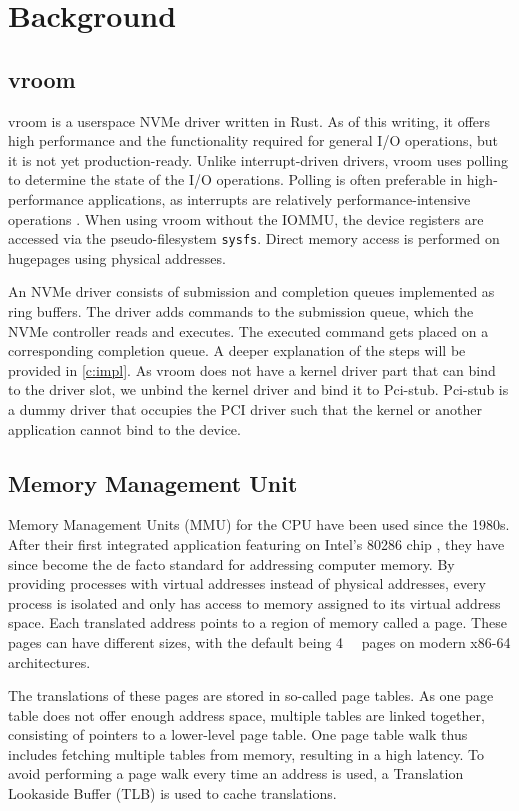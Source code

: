 \chapter{Background}

\section{vroom}
vroom is a userspace NVMe driver written in Rust. As of this writing, it offers high performance and the functionality required for general I/O operations, but it is not yet production-ready. Unlike interrupt-driven drivers, vroom uses polling to determine the state of the I/O operations. Polling is often preferable in high-performance applications, as interrupts are relatively performance-intensive operations \cite{spdksubmitting}.
When using vroom without the IOMMU, the device registers are accessed via the pseudo-filesystem \texttt{sysfs}. Direct memory access is performed on hugepages using physical addresses.

An NVMe driver consists of submission and completion queues implemented as ring buffers. The driver adds commands to the submission queue, which the NVMe controller reads and executes. The executed command gets placed on a corresponding completion queue. A deeper explanation of the steps will be provided in \autoref{c:impl}.
As vroom does not have a kernel driver part that can bind to the driver slot, we unbind the kernel driver and bind it to Pci-stub. Pci-stub is a dummy driver that occupies the PCI driver such that the kernel or another application cannot bind to the device.

\section{Memory Management Unit}
Memory Management Units (MMU) for the CPU have been used since the 1980s. After their first integrated application featuring on Intel's 80286 chip \cite{intel80286}, they have since become the de facto standard for addressing computer memory. By providing processes with virtual addresses instead of physical addresses, every process is isolated and only has access to memory assigned to its virtual address space. Each translated address points to a region of memory called a page. These pages can have different sizes, with the default being \qty{4}{\kibi\byte} pages on modern x86-64 architectures.

The translations of these pages are stored in so-called page tables. As one page table does not offer enough address space, multiple tables are linked together, consisting of pointers to a lower-level page table. One page table walk thus includes fetching multiple tables from memory, resulting in a high latency. To avoid performing a page walk every time an address is used, a Translation Lookaside Buffer (TLB) is used to cache translations.

